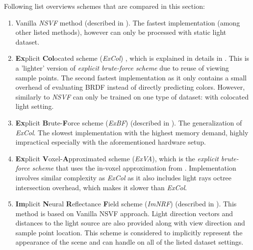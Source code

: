 Following list overviews schemes that are compared in this section:
\begin{enumerate}
    \item Vanilla \textit{NSVF} method \cite{liu2021neural} (described in ).
    The fastest implementation (among other listed methods),
    however can only be processed with static light dataset.
    \item \textbf{Ex}plicit \textbf{Col}ocated scheme (\textit{ExCol}) \cite{bi2020neural, liu2021neural}, which is explained in details in .
    This is a 'lighter' version of \textit{explicit brute-force scheme}
    due to reuse of viewing sample points.
    The second fastest implementation as it only contains
    a small overhead of evaluating BRDF instead of directly predicting colors.
    However, similarly to \textit{NSVF} can only be trained on one type of dataset: with colocated light setting.
    \item \textbf{Ex}plicit \textbf{B}rute-\textbf{F}orce scheme (\textit{ExBF}) (described in ).
    The generalization of \textit{ExCol}.
    The slowest implementation with the highest memory demand,
    highly impractical especially with the aforementioned hardware setup.
    \item \textbf{Ex}plicit \textbf{V}oxel-\textbf{A}pproximated scheme (\textit{ExVA}), which is the \textit{explicit brute-force scheme}
    that uses the in-voxel approximation from .
    Implementation involves similar complexity as \textit{ExCol}
    as it also includes light rays octree intersection overhead,
    which makes it slower than \textit{ExCol}.
    \item \textbf{Im}plicit \textbf{N}eural \textbf{R}eflectance \textbf{F}ield scheme (\textit{ImNRF}) (described in ).
    This method is based on Vanilla NSVF approach.
    Light direction vectors and distances to the light source are also provided along with view direction and sample point location.
    This scheme is considered to implicitly represent the appearance of the scene
    and can handle on all of the listed dataset settings.
\end{enumerate}




